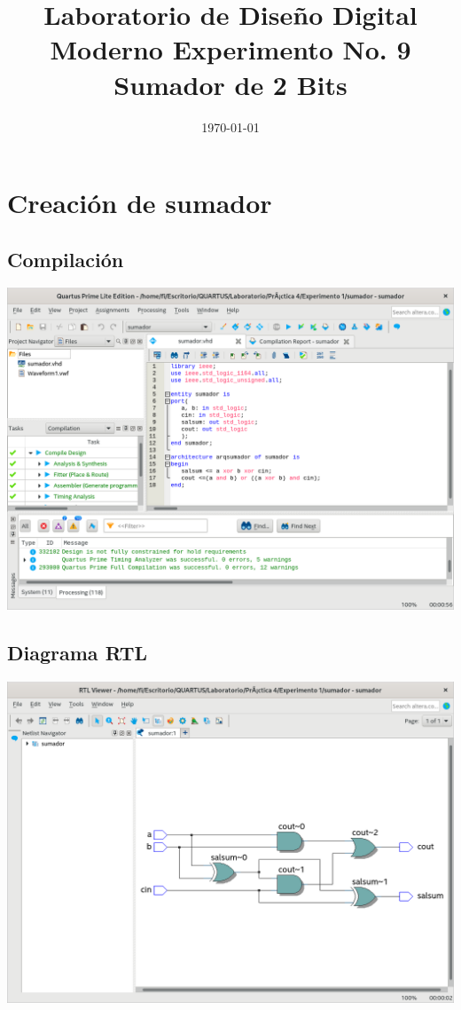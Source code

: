 \documentclass[10pt,a4paper]{article}
\title{Laboratorio de Diseño Digital Moderno Experimento No. 9 Sumador de 2 Bits}
\author{}
\date{\today}
\begin{document}
	\maketitle
	
	\section{Creación de sumador}
	\subsection{Compilación}
	\begin{center}
		\includegraphics[scale=0.35]{Compilacion.png}
	\end{center}
	
	\subsection{Diagrama RTL}
	\begin{center}
		\includegraphics[scale=0.35]{RTL.png}
	\end{center}
	
\end{document}
